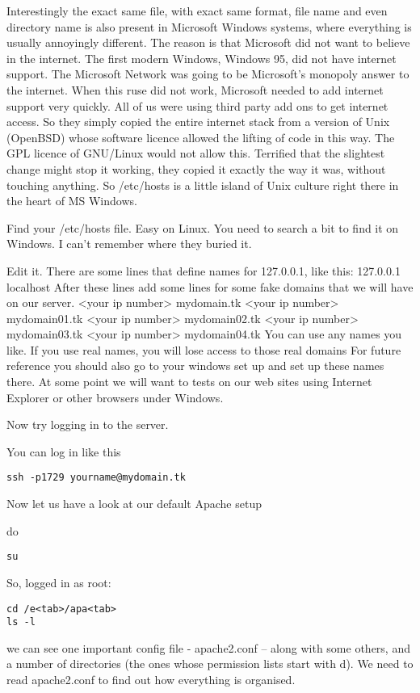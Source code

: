\documentclass[12pt, a4paper]{article}
\begin{document}
Interestingly the exact same file, with exact same format, file name and even directory name is also present in Microsoft Windows systems, where everything is usually annoyingly different. The reason is that Microsoft did not want to believe in the internet. The first modern Windows, Windows 95, did not have internet support. The Microsoft Network was going to be Microsoft’s monopoly answer to the internet. When this ruse did not work, Microsoft needed to add internet support very quickly. All of us were using third party add ons to get internet access. So they simply copied the entire internet stack from a version of Unix (OpenBSD) whose software licence allowed the lifting of code in this way. The GPL licence of GNU/Linux would not allow this. Terrified that the slightest change might stop it working, they copied it exactly the way it was, without touching anything. So /etc/hosts is a little island of Unix culture right there in the heart of MS Windows. 

Find your /etc/hosts file. Easy on Linux. You need to search a bit to find it on Windows. I can’t remember where they buried it.

Edit it. There are some lines that define names for 127.0.0.1, like this:
127.0.0.1	localhost
After these lines add some lines for some fake domains that we will have on our server.
<your ip number>	mydomain.tk
<your ip number>	mydomain01.tk
<your ip number>	mydomain02.tk
<your ip number>	mydomain03.tk
<your ip number>	mydomain04.tk
You can use any names you like. If you use real names, you will lose access to those real domains
For future reference you should also go to your windows set up and set up these names there. At some point we will want to tests on our web sites using Internet Explorer or other browsers under Windows.

Now try logging in to the server.

You can log in like this

\begin{verbatim}
ssh -p1729 yourname@mydomain.tk
\end{verbatim}
Now let us have a look at our default Apache setup

do 
\begin{verbatim}
su
\end{verbatim}

So, logged in as root:

\begin{verbatim}
cd /e<tab>/apa<tab>
ls -l
\end{verbatim}
we can see one important config file - apache2.conf – along with some others, and a number of directories (the ones whose permission lists start with d).
We need to read apache2.conf to find out how everything is organised.
\end{document}
